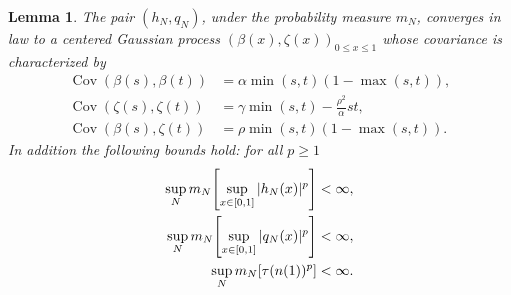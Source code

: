 \documentclass[10pt]{amsart}
\newtheorem{lemm}[theo]{Lemma}\newtheorem{prop}[theo]{Proposition}\newtheorem{coro}[theo]{Corollary}\newtheorem{conj}[theo]{Conjecture}
\theoremstyle{definition}\newtheorem{defi}[theo]{Definition}\newtheorem{rema}[theo]{Remark}\newtheorem{exam}[theo]{Example}\newtheorem{exem}[theo]{Example}\newtheorem{nota}[theo]{Notation}
\DeclareMathOperator{\Cov}{Cov}
\theoremstyle{plain}
\let\originalleft\left
\let\originalright\right
\renewcommand{\left}{\mathopen{}\mathclose\bgroup\originalleft}
\renewcommand{\right}{\aftergroup\egroup\originalright}
\begin{document}
\begin{lemm}\label{Lemma:Gaussian}
The pair $(h_N,q_N)$, under the probability measure $m_N$, converges in law to a centered Gaussian process $(\beta(x),\zeta(x))_{0\le x \le 1}$ whose covariance is characterized by
\begin{align*}
\Cov(\beta(s),\beta(t)) &= \alpha \min(s,t)(1-\max(s,t)) ,\\
 \Cov(\zeta(s),\zeta(t)) &= \gamma \min(s,t) - \frac{\rho^2}{\alpha} st ,\\
\Cov(\beta(s),\zeta(t)) &= \rho \min(s,t)(1-\max(s,t)).
\end{align*}
In addition the following bounds hold: for all $p\ge 1$
\begin{align*}
\sup_N m_N\left[\sup_{x\in [0,1]} | h_N(x) |^p\right] &< \infty,\\
\sup_N m_N\left[\sup_{x\in [0,1]} | q_N(x) |^p\right] &< \infty, \\
\sup_N m_N[\tau(n(1))^p] &< \infty.
\end{align*}
\end{lemm}
\end{document}
